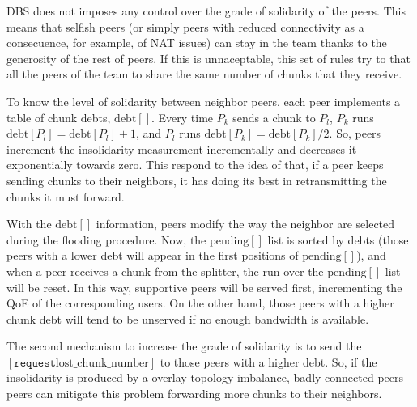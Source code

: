 
DBS does not imposes any control over the grade of solidarity of the
peers. This means that selfish peers (or simply peers with
reduced connectivity as a consecuence, for example, of NAT issues) can
stay in the team thanks to the generosity of the rest of peers. If
this is unnaceptable, this set of rules try to that all the peers of the
team to share the same number of chunks that they receive.

To know the level of solidarity between neighbor peers, each peer
implements a table of chunk debts, $\text{debt}[]$. Every time $P_k$
sends a chunk to $P_l$, $P_k$ runs $\text{debt}[P_l] =
\text{debt}[P_l]+1$, and $P_l$ runs $\text{debt}[P_k] =
\text{debt}[P_k]/2$. So, peers increment the insolidarity measurement
incrementally and decreases it exponentially towards zero. This
respond to the idea of that, if a peer keeps sending chunks to their
neighbors, it has doing its best in retransmitting the chunks it must
forward.

With the $\text{debt}[]$ information, peers modify the way the
neighbor are selected during the flooding procedure. Now, the
$\text{pending}[]$ list is sorted by debts (those peers with a lower
debt will appear in the first positions of $\text{pending}[]$), and
when a peer receives a chunk from the splitter, the run over the
$\text{pending}[]$ list will be reset. In this way, supportive peers
will be served first, incrementing the QoE of the corresponding
users. On the other hand, those peers with a higher chunk debt will
tend to be unserved if no enough bandwidth is available.

The second mechanism to increase the grade of solidarity is to send
the $[\mathtt{request} \text{lost\_chunk\_number}]$ to those peers
with a higher debt. So, if the insolidarity is produced by a overlay
topology imbalance, badly connected peers peers can mitigate this
problem forwarding more chunks to their neighbors.

